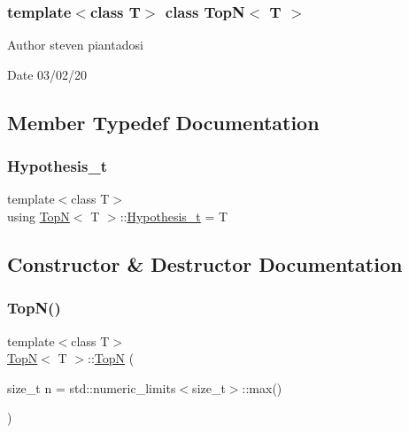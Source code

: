 \subsubsection*{template$<$class T$>$\newline
class Top\+N$<$ T $>$}

\begin{DoxyAuthor}{Author}
steven piantadosi 
\end{DoxyAuthor}
\begin{DoxyDate}{Date}
03/02/20 
\end{DoxyDate}


\subsection{Member Typedef Documentation}
\mbox{\label{class_top_n_ae734a8791a54516fecbc8cac2c67d16a}} 
\subsubsection{\texorpdfstring{Hypothesis\+\_\+t}{Hypothesis\_t}}
{\footnotesize\ttfamily template$<$class T$>$ \\
using \hyperlink{class_top_n}{TopN}$<$ T $>$\+::\hyperlink{class_top_n_ae734a8791a54516fecbc8cac2c67d16a}{Hypothesis\+\_\+t} =  T}



\subsection{Constructor \& Destructor Documentation}
\mbox{\label{class_top_n_a0ad4e5b78ff09e519ef1c5f361d4c6c0}} 
\subsubsection{\texorpdfstring{Top\+N()}{TopN()}\hspace{0.1cm}{\footnotesize\ttfamily [1/3]}}
{\footnotesize\ttfamily template$<$class T$>$ \\
\hyperlink{class_top_n}{TopN}$<$ T $>$\+::\hyperlink{class_top_n}{TopN} (\begin{DoxyParamCaption}\item[{size\+\_\+t}]{n = {\ttfamily std\+:\+:numeric\+\_\+limits$<$size\+\_\+t$>$\+:\+:max()} }\end{DoxyParamCaption})\hspace{0.3cm}{\ttfamily [inline]}}

